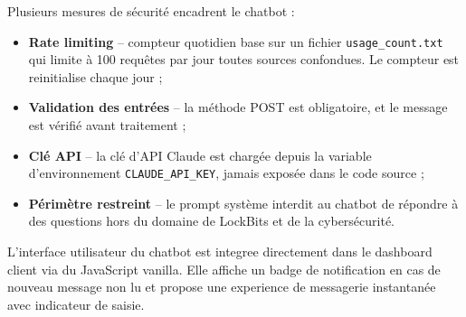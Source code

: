Plusieurs mesures de sécurité encadrent le chatbot :

\begin{itemize}
  \item \textbf{Rate limiting} -- compteur quotidien base sur un fichier
    \texttt{usage\_count.txt} qui limite à 100 requêtes par jour toutes
    sources confondues. Le compteur est reinitialise chaque jour ;
  \item \textbf{Validation des entrées} -- la méthode POST est obligatoire,
    et le message est vérifié avant traitement ;
  \item \textbf{Clé API} -- la clé d'API Claude est chargée depuis la
    variable d'environnement \texttt{CLAUDE\_API\_KEY}, jamais exposée
    dans le code source ;
  \item     \textbf{Périmètre restreint} -- le prompt système interdit au
    chatbot de répondre à des questions hors du domaine de LockBits et
    de la cybersécurité.
\end{itemize}

L'interface utilisateur du chatbot est integree directement dans le
dashboard client via du JavaScript vanilla. Elle affiche un badge de
notification en cas de nouveau message non lu et propose une experience
de messagerie instantanée avec indicateur de saisie.
